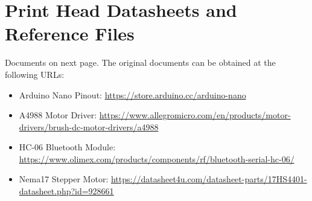 \chapter{Print Head Datasheets and Reference Files}
\label{ann:bioprinting_system_datasheets}

Documents on next page. The original documents can be obtained at the following URLs:

\begin{itemize}
    \item Arduino Nano Pinout: \url{https://store.arduino.cc/arduino-nano}
    \item A4988 Motor Driver: \url{https://www.allegromicro.com/en/products/motor-drivers/brush-dc-motor-drivers/a4988}
    \item HC-06 Bluetooth Module: \url{https://www.olimex.com/products/components/rf/bluetooth-serial-hc-06/}
    \item Nema17 Stepper Motor: \url{https://datasheet4u.com/datasheet-parts/17HS4401-datasheet.php?id=928661}
\end{itemize}




